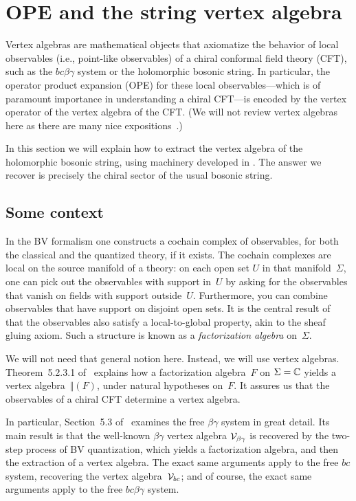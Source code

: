 \section{OPE and the string vertex algebra}


Vertex algebras are mathematical objects that axiomatize the behavior of local observables 
(i.e., point-like observables) of a chiral conformal field theory (CFT),
such as the $bc\beta\gamma$ system or the holomorphic bosonic string.
In particular, the operator product expansion (OPE) for these local observables---which is of paramount importance in understanding a chiral CFT---is encoded by the vertex operator of the vertex algebra of the CFT.
(We will not review vertex algebras here
as there are many nice expositions~\cite{FHL, BZF}.)

In this section we will explain how to extract the vertex algebra of the holomorphic bosonic string,
using machinery developed in \cite{CG1,LiVA,GGW}.
The answer we recover is precisely the chiral sector of the usual bosonic string.

\subsection{Some context}

In the BV formalism one constructs a cochain complex of observables,
for both the classical and the quantized theory, if it exists.
The cochain complexes are local on the source manifold of a theory:
on each open set $U$ in that manifold~$\Sigma$,
one can pick out the observables with support in~$U$ by asking for the observables that vanish on fields with support outside~$U$.
Furthermore, you can combine observables that have support on disjoint open sets.
It is the central result of~\cite{CG1,CG2} that the observables also satisfy a local-to-global property,
akin to the sheaf gluing axiom.
Such a structure is known as a {\em factorization algebra} on~$\Sigma$.

We will not need that general notion here.
Instead, we will use vertex algebras.
Theorem~5.2.3.1 of~\cite{CG1} explains how a factorization algebra~$F$ on $\Sigma = \mathbb C$
yields a vertex algebra~$\Vert(F)$, under natural hypotheses on~$F$. 
It assures us that the observables of a chiral CFT determine a vertex algebra.

In particular, Section~5.3 of~\cite{CG1} examines the free $\beta\gamma$ system in great detail.
Its main result is that the well-known $\beta\gamma$ vertex algebra $\mathcal{V}_{\beta\gamma}$ is recovered by the two-step process of BV quantization, which yields a factorization algebra, and then the extraction of a vertex algebra.
The exact same arguments apply to the free $bc$ system,
recovering the vertex algebra~$\mathcal{V}_{bc}$;
and of course, the exact same arguments apply to the free $bc\beta\gamma$ system.

